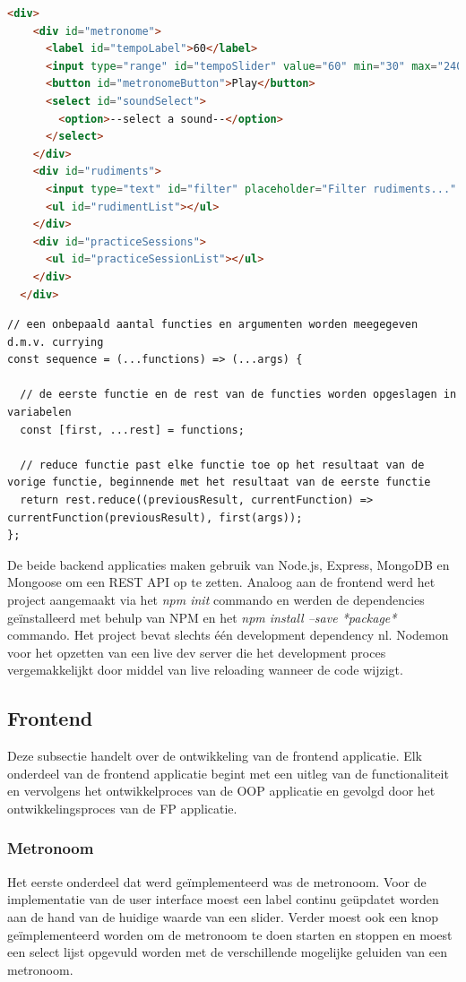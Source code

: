 \begin{lstlisting}[language=HTML, caption=HTML pagina voor de frontend applicatie]
  <div>
    <div id="metronome">
      <label id="tempoLabel">60</label>
      <input type="range" id="tempoSlider" value="60" min="30" max="240" />
      <button id="metronomeButton">Play</button>
      <select id="soundSelect">
        <option>--select a sound--</option>
      </select>
    </div>
    <div id="rudiments">
      <input type="text" id="filter" placeholder="Filter rudiments..." />
      <ul id="rudimentList"></ul>
    </div>
    <div id="practiceSessions">
      <ul id="practiceSessionList"></ul>
    </div>
  </div>
  \end{lstlisting}

\begin{lstlisting}[caption=Sequence functie]
// een onbepaald aantal functies en argumenten worden meegegeven d.m.v. currying
const sequence = (...functions) => (...args) { 

  // de eerste functie en de rest van de functies worden opgeslagen in variabelen
  const [first, ...rest] = functions; 

  // reduce functie past elke functie toe op het resultaat van de vorige functie, beginnende met het resultaat van de eerste functie
  return rest.reduce((previousResult, currentFunction) => currentFunction(previousResult), first(args)); 
};
\end{lstlisting}

De beide backend applicaties maken gebruik van Node.js, Express, MongoDB en Mongoose om een REST API op te zetten. Analoog aan de frontend werd het project aangemaakt via het \textit{npm init} commando en werden de dependencies geïnstalleerd met behulp van NPM en het \textit{npm install --save *package*} commando. Het project bevat slechts één development dependency nl. Nodemon voor het opzetten van een live dev server die het development proces vergemakkelijkt door middel van live reloading wanneer de code wijzigt. 

\subsection{Frontend}
Deze subsectie handelt over de ontwikkeling van de frontend applicatie. Elk onderdeel van de frontend applicatie begint met een uitleg van de functionaliteit en vervolgens het ontwikkelproces van de OOP applicatie en gevolgd door het ontwikkelingsproces van de FP applicatie.

\subsubsection{Metronoom}
 Het eerste onderdeel dat werd geïmplementeerd was de metronoom. Voor de implementatie van de user interface moest een label continu geüpdatet worden aan de hand van de huidige waarde van een slider. Verder moest ook een knop geïmplementeerd worden om de metronoom te doen starten en stoppen en moest een select lijst opgevuld worden met de verschillende mogelijke geluiden van een metronoom. 
 
